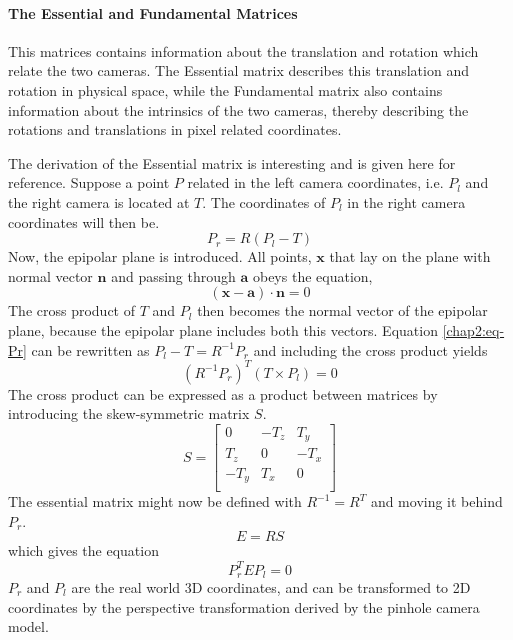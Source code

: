\paragraph{The Essential and Fundamental Matrices}
This matrices contains information about the translation and rotation which relate the
two cameras. The Essential matrix describes this translation and rotation in physical
space, while the Fundamental matrix also contains information about the intrinsics of the
two cameras, thereby describing the rotations and translations in pixel related
coordinates.

The derivation of the Essential matrix is interesting and is given here for reference.
Suppose a point $P$ related in the left camera coordinates, i.e. $P_l$ and the right
camera is located at $T$. The coordinates of $P_l$ in the right camera coordinates will
then be.
\begin{equation}
    \label{chap2:eq-Pr}
    P_r = R (P_l - T)
\end{equation}
Now, the epipolar plane is introduced. All points, $\mathbf{x}$ that lay on the plane with normal vector
$\mathbf{n}$ and passing through $\mathbf{a}$ obeys the equation,
\begin{equation*}
    (\mathbf{x} - \mathbf{a}) \cdot \mathbf{n} = 0
\end{equation*}
The cross product of $T$ and $P_l$ then becomes the normal vector of the epipolar plane,
because the epipolar plane includes both this vectors. Equation \eqref{chap2:eq-Pr} can be
rewritten as $P_l - T = R^{-1} P_r$ and including the cross product yields 
\begin{equation}
    (R^{-1} P_r)^T (T \times P_l) = 0
\end{equation}
The cross product can be expressed as a product between matrices by introducing the
skew-symmetric matrix $S$. \cite{modsim}
\begin{equation}
    S = \left [ \begin{array}{ccc}
                0 & -T_z & T_y \\
                T_z & 0 & -T_x \\
                -T_y & T_x & 0 \\ \end{array} \right]
\end{equation}
The essential matrix might now be defined with $R^{-1} = R^T$ and moving it behind $P_r$.
\begin{equation}
    E = RS 
\end{equation}
which gives the equation
\begin{equation}
    \label{chap2:eq-fundamental}
    P_r^T E P_l = 0
\end{equation}
$P_r$ and $P_l$ are the real world 3D coordinates, and can be transformed to 2D
coordinates by the perspective transformation derived by the pinhole camera model. 

